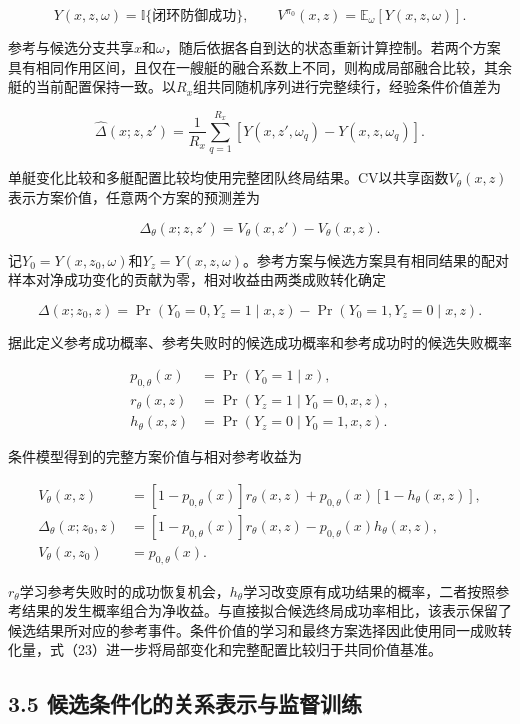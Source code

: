 \documentclass[UTF8,a4paper,zihao=5,fontset=none]{ctexart}
\begin{document}
\[
Y(x,z,\omega)=\mathbb I\{\text{闭环防御成功}\},
\qquad
V^{\pi_0}(x,z)=\mathbb E_\omega[Y(x,z,\omega)].
\tag{21}
\]

参考与候选分支共享\(x\)和\(\omega\)，随后依据各自到达的状态重新计算控制。若两个方案具有相同作用区间，且仅在一艘艇的融合系数上不同，则构成局部融合比较，其余艇的当前配置保持一致。以\(R_x\)组共同随机序列进行完整续行，经验条件价值差为

\[
\widehat\Delta(x;z,z')
=\frac1{R_x}\sum_{q=1}^{R_x}
\left[Y(x,z',\omega_q)-Y(x,z,\omega_q)\right].
\tag{22}
\]

单艇变化比较和多艇配置比较均使用完整团队终局结果。CV以共享函数\(V_\theta(x,z)\)表示方案价值，任意两个方案的预测差为

\[
\Delta_\theta(x;z,z')=V_\theta(x,z')-V_\theta(x,z).
\tag{23}
\]

记\(Y_0=Y(x,z_0,\omega)\)和\(Y_z=Y(x,z,\omega)\)。参考方案与候选方案具有相同结果的配对样本对净成功变化的贡献为零，相对收益由两类成败转化确定

\[
\Delta(x;z_0,z)
=\Pr(Y_0=0,Y_z=1\mid x,z)
-\Pr(Y_0=1,Y_z=0\mid x,z).
\tag{24}
\]

据此定义参考成功概率、参考失败时的候选成功概率和参考成功时的候选失败概率

\[
\begin{aligned}
p_{0,\theta}(x)&=\Pr(Y_0=1\mid x),\\
r_\theta(x,z)&=\Pr(Y_z=1\mid Y_0=0,x,z),\\
h_\theta(x,z)&=\Pr(Y_z=0\mid Y_0=1,x,z).
\end{aligned}
\tag{25}
\]

条件模型得到的完整方案价值与相对参考收益为

\[
\begin{aligned}
V_\theta(x,z)
&=[1-p_{0,\theta}(x)]r_\theta(x,z)
+p_{0,\theta}(x)[1-h_\theta(x,z)],\\
\Delta_\theta(x;z_0,z)
&=[1-p_{0,\theta}(x)]r_\theta(x,z)
-p_{0,\theta}(x)h_\theta(x,z),\\
V_\theta(x,z_0)&=p_{0,\theta}(x).
\end{aligned}
\tag{26}
\]

\(r_\theta\)学习参考失败时的成功恢复机会，\(h_\theta\)学习改变原有成功结果的概率，二者按照参考结果的发生概率组合为净收益。与直接拟合候选终局成功率相比，该表示保留了候选结果所对应的参考事件。条件价值的学习和最终方案选择因此使用同一成败转化量，式（23）进一步将局部变化和完整配置比较归于共同价值基准。

\subsection*{3.5
候选条件化的关系表示与监督训练}
\end{document}
